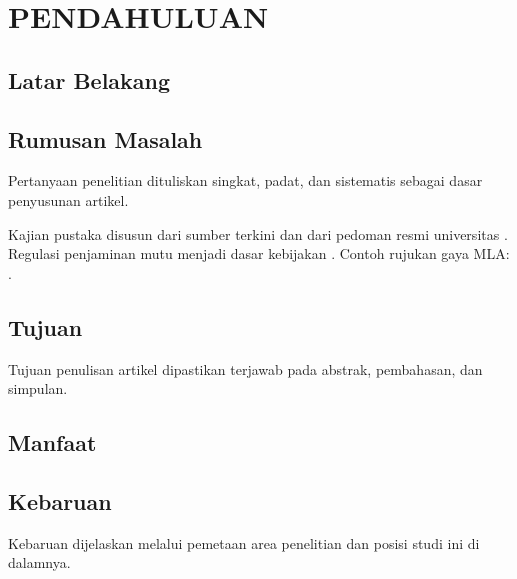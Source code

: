 \chapter{PENDAHULUAN}
\section{Latar Belakang}
\section{Rumusan Masalah}
Pertanyaan penelitian dituliskan singkat, padat, dan sistematis sebagai dasar penyusunan artikel.

Kajian pustaka disusun dari sumber terkini \citep{creswell2018research, patten2017understanding}
dan dari pedoman resmi universitas \citep{unnes2024panduanakademik}. Regulasi penjaminan mutu
menjadi dasar kebijakan \citep{permendikbudristek2023}.
 Contoh rujukan gaya MLA: .

\section{Tujuan}
Tujuan penulisan artikel dipastikan terjawab pada abstrak, pembahasan, dan simpulan.

\section{Manfaat}
\section{Kebaruan}
Kebaruan dijelaskan melalui pemetaan area penelitian dan posisi studi ini di dalamnya.
